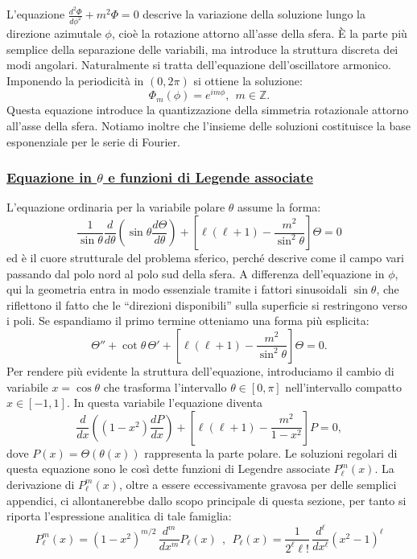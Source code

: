 \documentclass[a4paper,12pt]{report}
\begin{document}
L’equazione
$\frac{d^2 \Phi}{d\phi^2} + m^2 \Phi = 0$
descrive la variazione della soluzione lungo la direzione azimutale $\phi$, cioè la rotazione attorno all’asse della sfera. È la parte più semplice della separazione delle variabili, ma introduce la struttura discreta dei modi angolari. Naturalmente si tratta dell'equazione dell'oscillatore armonico. Imponendo la periodicità in $(0, 2\pi)$ si ottiene la soluzione:
\[
\Phi_m(\phi)=e^{im\phi}, \ \ m\in \mathbb{Z}.
\]
Questa equazione introduce la quantizzazione della simmetria rotazionale attorno all’asse della sfera. Notiamo inoltre che l'insieme delle soluzioni costituisce la base esponenziale per le serie di Fourier.

\newpage

\subsubsection{\underline{Equazione in $\theta$ e funzioni di Legende associate}}

L’equazione ordinaria per la variabile polare $\theta$ assume la forma:
\[
\frac{1}{\sin\theta}\frac{d}{d\theta}\left(\sin\theta \frac{d\Theta}{d\theta}\right)
+ \left[\ell(\ell+1)-\frac{m^2}{\sin^2\theta}\right]\Theta = 0
\]
ed è il cuore strutturale del problema sferico, perché descrive come il campo vari passando dal polo nord al polo sud della sfera. A differenza dell’equazione in $\phi$, qui la geometria entra in modo essenziale tramite i fattori sinusoidali $\sin\theta$, che riflettono il fatto che le “direzioni disponibili” sulla superficie si restringono verso i poli.
Se espandiamo il primo termine otteniamo una forma più esplicita:
\[
\Theta'' + \cot\theta\,\Theta' + \left[\ell(\ell+1)-\frac{m^2}{\sin^2\theta}\right]\Theta = 0.
\]
Per rendere più evidente la struttura dell’equazione, introduciamo il cambio di variabile $x=\cos\theta$ che trasforma l’intervallo $\theta\in[0,\pi]$ nell’intervallo compatto $x\in[-1,1]$. In questa variabile l’equazione diventa
\[
\frac{d}{dx}\left((1-x^2)\frac{dP}{dx}\right)
+ \left[\ell(\ell+1)-\frac{m^2}{1-x^2}\right]P = 0,
\]
dove $P(x)=\Theta(\theta(x))$ rappresenta la parte polare. Le soluzioni regolari di questa equazione sono le così dette funzioni di Legendre associate $P_\ell^m(x)$. La derivazione di $P_\ell^m(x)$, oltre a essere eccessivamente gravosa per delle semplici appendici, ci allontanerebbe dallo scopo principale di questa sezione, per tanto si riporta l'espressione analitica di tale famiglia:
\[
P_\ell^m(x) = (1-x^2)^{m/2}\,\frac{d^m}{dx^m}P_\ell(x) \ \ ,\ \ P_\ell(x)=\frac{1}{2^\ell \ell!}\,\frac{d^\ell}{dx^\ell}\left(x^2-1\right)^\ell
\]
\end{document}
